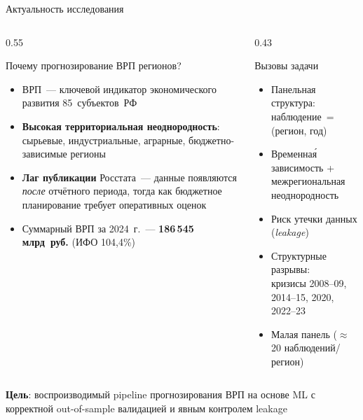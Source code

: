 \documentclass[aspectratio=169,12pt]{beamer}
\begin{document}
\begin{frame}{Актуальность исследования}
\begin{columns}[T]
  \begin{column}{0.55\textwidth}
    \begin{block}{Почему прогнозирование ВРП регионов?}
      \begin{itemize}
        \item ВРП~— ключевой индикатор экономического развития 85~субъектов~РФ
        \item \textbf{Высокая территориальная неоднородность}: сырьевые,
              индустриальные, аграрные, бюджетно-зависимые регионы
        \item \textbf{Лаг публикации} Росстата~— данные появляются
              \textit{после} отчётного периода, тогда как бюджетное
              планирование требует оперативных оценок
        \item Суммарный ВРП за 2024~г.~--- \textbf{186\,545 млрд~руб.} (ИФО 104,4\%)
      \end{itemize}
    \end{block}
  \end{column}
  \begin{column}{0.43\textwidth}
    \begin{block}{Вызовы задачи}
      \begin{itemize}
        \item Панельная структура: наблюдение~= (регион, год)
        \item Временна\'{я} зависимость + межрегиональная неоднородность
        \item Риск утечки данных (\textit{leakage})
        \item Структурные разрывы:\\
              кризисы 2008–09, 2014–15, 2020, 2022–23
        \item Малая панель ($\approx$\,20 наблюдений/регион)
      \end{itemize}
    \end{block}
  \end{column}
\end{columns}
\vspace{0.4em}
\begin{alertblock}{}
  \centering
  \textbf{Цель}: воспроизводимый pipeline прогнозирования ВРП на основе ML
  с корректной out-of-sample валидацией и явным контролем leakage
\end{alertblock}
\end{frame}
\end{document}
